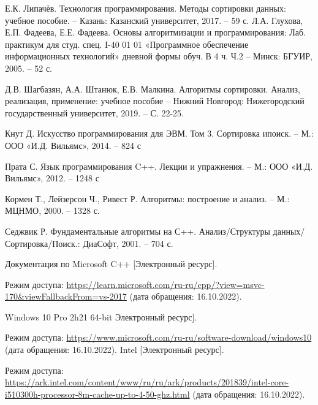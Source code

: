 \renewcommand\bibname{Список используемой литературы} %

\begin{thebibliography}{}
	\label{bib:book_lipachev}
	Е.К. Липачѐв. Технология программирования. Методы сортировки данных: учебное
	пособие. – Казань: Казанский университет, 2017. – 59 с.
	Л.А. Глухова, Е.П. Фадеева, Е.Е. Фадеева. Основы алгоритмизации и программирования: Лаб. практикум для студ. спец. I-40 01 01 «Программное обеспечение информационных технологий» дневной формы обуч. В 4 ч. Ч.2 – Минск: БГУИР, 2005. – 52 с.
	
	\label{bib:book_sort_algorithms}
	Д.В. Шагбазян, А.А. Штанюк, Е.В. Малкина. Алгоритмы сортировки. Анализ, реализация, применение: учебное пособие – Нижний Новгород: Нижегородский государственный университет, 2019. – С. 22-25.
	
	\label{bib:book_knut}
	Кнут Д. Искусство программирования для ЭВМ. Том 3. Сортировка ипоиск. – М.: ООО «И.Д. Вильямс», 2014. – 824 с
	
	\label{bib:book_prat}
	Прата С. Язык программирования C++. Лекции и упражнения. – М.:
	ООО «И.Д. Вильямс», 2012. – 1248 с
	
	\label{bib:book_kormen}
	Кормен Т., Лейзерсон Ч., Ривест Р. Алгоритмы: построение и анализ. – М.: МЦНМО, 2000. – 1328 с.
	
	\label{bib:book_sejik}
	Седжвик Р. Фундаментальные алгоритмы на С++. Анализ/Структуры данных/Сортировка/Поиск.: ДиаСофт, 2001. – 704 с.
	
	\label{bib:сpp}
	Документация по Microsoft C++ [Электронный ресурс]. 
	
	Режим доступа: \url{https://learn.microsoft.com/ru-ru/cpp/?view=msvc-170&viewFallbackFrom=vs-2017} (дата обращения: 16.10.2022).
	
	\label{bib:windows}
	Windows 10 Pro 2h21 64-bit  Электронный ресурс]. 
	
	Режим доступа: \url{https://www.microsoft.com/ru-ru/software-download/windows10} (дата обращения: 16.10.2022).
	\label{bib:intel}
	Intel [Электронный ресурс]. 
	
	Режим доступа: \url{https://ark.intel.com/content/www/ru/ru/ark/products/201839/intel-core-i510300h-processor-8m-cache-up-to-4-50-ghz.html} (дата обращения: 16.10.2022).
\end{thebibliography}